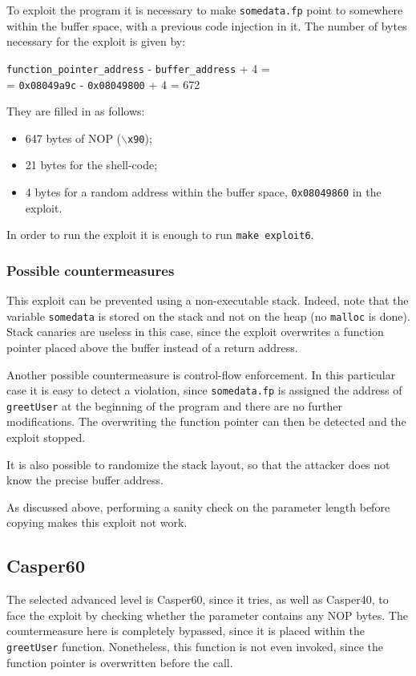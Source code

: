 To exploit the program it is necessary to make \texttt{somedata.fp} point to somewhere within the buffer space, with a previous code injection in it. The number of bytes necessary for the exploit is given by:

\begin{center}
	\texttt{function\_pointer\_address} - \texttt{buffer\_address} + 4 = \\
	= \texttt{0x08049a9c} - \texttt{0x08049800} + 4 = 672
\end{center}

They are filled in as follows:
\begin{itemize}
	\item 647 bytes of NOP (\texttt{$\backslash$x90});
	\item 21 bytes for the shell-code;
	\item 4 bytes for a random address within the buffer space, \texttt{0x08049860} in the exploit.
\end{itemize}

In order to run the exploit it is enough to run \texttt{make exploit6}.

\subsubsection{Possible countermeasures}
This exploit can be prevented using a non-executable stack. Indeed, note that the variable \texttt{somedata} is stored on the stack and not on the heap (no \texttt{malloc} is done). Stack canaries are useless in this case, since the exploit overwrites a function pointer placed above the buffer instead of a return address.

Another possible countermeasure is control-flow enforcement. In this particular case it is easy to detect a violation, since \texttt{somedata.fp} is assigned the address of \texttt{greetUser} at the beginning of the program and there are no further modifications. The overwriting the function pointer can then be detected and the exploit stopped.

It is also possible to randomize the stack layout, so that the attacker does not know the precise buffer address.

As discussed above, performing a sanity check on the parameter length before copying makes this exploit not work.

\subsection{Casper60}
The selected advanced level is Casper60, since it tries, as well as Casper40, to face the exploit by checking whether the parameter contains any NOP bytes. The countermeasure here is completely bypassed, since it is placed within the \texttt{greetUser} function. Nonetheless, this function is not even invoked, since the function pointer is overwritten before the call. 

